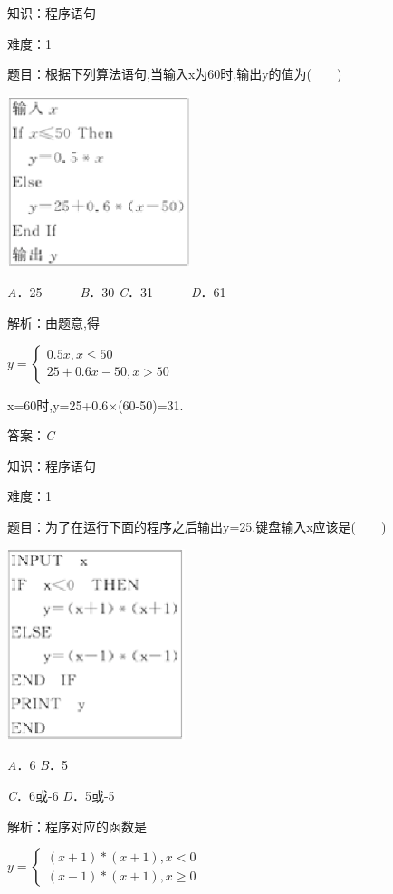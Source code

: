 \documentclass{article} %
\begin{document}
知识：程序语句

难度：1

题目：根据下列算法语句,当输入x为60时,输出y的值为(　　)

\includegraphics*[width=2.11in, height=1.97in, keepaspectratio=false]{image46}

\textit{A}．25　　　\textit{B}．30  \textit{C}．31　　　\textit{D}．61

解析：由题意,得

$y=
\left\{\begin{array}{l}
0.5x,x\le50\\
25+0.6x-50,x>50
\end{array}\right.$

x=60时,y=25+0.6$\mathrm{\times}$(60-50)=31.

答案：\textit{C}

知识：程序语句

难度：1

题目：为了在运行下面的程序之后输出y=25,键盘输入x应该是(　　)

\textit{\includegraphics*[width=2.04in, height=2.20in, keepaspectratio=false]{image47}}

\textit{A}．6        \textit{B}．5

\textit{C}．6或-6   \textit{D}．5或-5

解析：程序对应的函数是

$y=\left\{
	\begin{array}{l}
	(x+1)*(x+1),x<0\\
	(x-1)*(x+1),x\ge 0
	\end{array}
	\right.$
\end{document}
